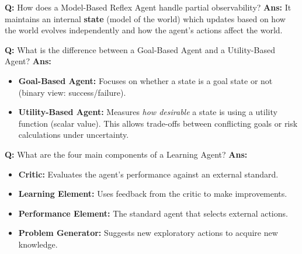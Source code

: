 \documentclass[10pt,a4paper,twocolumn]{article}
\begin{document}
\begin{tcolorbox}[
  colback=white,
  colframe=UnitColorTwo,
  colbacktitle=gray!10!white,
  coltitle=black,
  fonttitle=\bfseries\sffamily\small,
  title={Unit II $\bullet$ Card 5: Model-Based Reflex Agent},
  boxrule=1.2pt,
  arc=2mm,
  outer arc=2mm,
  boxsep=1.5mm,
  top=1mm,
  bottom=1mm,
  left=1.5mm,
  right=1.5mm,
  before skip=2.5mm,
  after skip=2.5mm
]
\textbf{Q:} How does a Model-Based Reflex Agent handle partial observability?
\tcbline
\textbf{Ans:} It maintains an internal \textbf{state} (model of the world) which updates based on how the world evolves independently and how the agent's actions affect the world.
\end{tcolorbox}


\begin{tcolorbox}[
  colback=white,
  colframe=UnitColorTwo,
  colbacktitle=gray!10!white,
  coltitle=black,
  fonttitle=\bfseries\sffamily\small,
  title={Unit II $\bullet$ Card 6: Goal-Based vs. Utility-Based Agents},
  boxrule=1.2pt,
  arc=2mm,
  outer arc=2mm,
  boxsep=1.5mm,
  top=1mm,
  bottom=1mm,
  left=1.5mm,
  right=1.5mm,
  before skip=2.5mm,
  after skip=2.5mm
]
\textbf{Q:} What is the difference between a Goal-Based Agent and a Utility-Based Agent?
\tcbline
\textbf{Ans:} \begin{itemize}
  \item   \textbf{Goal-Based Agent:} Focuses on whether a state is a goal state or not (binary view: success/failure).
  \item   \textbf{Utility-Based Agent:} Measures \textit{how desirable} a state is using a utility function (scalar value). This allows trade-offs between conflicting goals or risk calculations under uncertainty.
\end{itemize}
\end{tcolorbox}


\begin{tcolorbox}[
  colback=white,
  colframe=UnitColorTwo,
  colbacktitle=gray!10!white,
  coltitle=black,
  fonttitle=\bfseries\sffamily\small,
  title={Unit II $\bullet$ Card 7: Learning Agent Components},
  boxrule=1.2pt,
  arc=2mm,
  outer arc=2mm,
  boxsep=1.5mm,
  top=1mm,
  bottom=1mm,
  left=1.5mm,
  right=1.5mm,
  before skip=2.5mm,
  after skip=2.5mm
]
\textbf{Q:} What are the four main components of a Learning Agent?
\tcbline
\textbf{Ans:} \begin{itemize}
  \item   \textbf{Critic:} Evaluates the agent's performance against an external standard.
  \item   \textbf{Learning Element:} Uses feedback from the critic to make improvements.
  \item   \textbf{Performance Element:} The standard agent that selects external actions.
  \item   \textbf{Problem Generator:} Suggests new exploratory actions to acquire new knowledge.
\end{itemize}
\end{tcolorbox}
\end{document}
